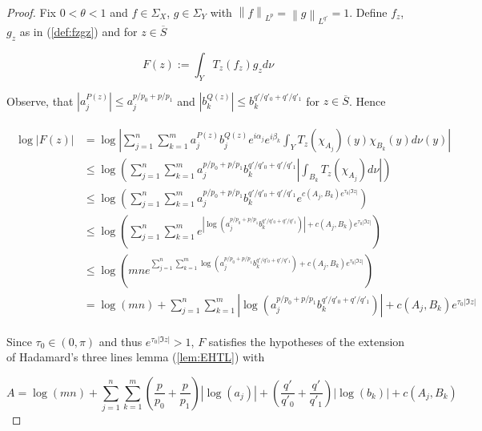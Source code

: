 \begin{proof}
	Fix $0 < \theta < 1$ and $f \in \Sigma_X$, $g \in \Sigma_Y$ with $\left\|f\right\|_{L^p} = \left\|g\right\|_{L^{q'}} = 1$. Define $f_z$, $g_z$ as in (\ref{def:fzgz}) and for $z \in \overline{S}$

	\begin{equation}
		F(z) := \int_Y T_z(f_z)g_z d\nu	
	\end{equation}

	Observe, that $\left| a^{P(z)}_j\right| \leqslant a_j^{p/p_0 + p/p_1}$ and $\left| b^{Q(z)}_k\right| \leqslant b_k^{q'/q'_0 + q'/q'_1}$ for $z \in \overline{S}$. Hence

	\begin{gather*}
		\begin{aligned}
			\log \left| F(z) \right| &= \log \left| \sum_{j = 1}^n\sum_{k = 1}^m a^{P(z)}_j b_j^{Q(z)} e^{i\alpha_j} e^{i\beta_k} \int_YT_z(\chi_{A_j})(y)\chi_{B_k}(y)d\nu(y)\right|\\
			&\leqslant  \log \left( \sum_{j = 1}^n\sum_{k = 1}^m a_j^{p/p_0 + p/p_1} b_k^{q'/q'_0 + q'/q'_1} \left|\int_{B_k} T_z(\chi_{A_j}) d\nu\right|\right)\\
			&\leqslant \log\left( \sum_{j = 1}^n\sum_{k = 1}^m a_j^{p/p_0 + p/p_1} b_k^{q'/q'_0 + q'/q'_1} e^{c(A_j,B_k)e^{\tau_0 \left| \Im z\right|}} \right)\\
			&\leqslant  \log\left( \sum_{j = 1}^n\sum_{k = 1}^m e^{\left|\log\left(a_j^{p/p_0 + p/p_1} b_k^{q'/q'_0 + q'/q'_1}\right)\right| + c(A_j,B_k)e^{\tau_0 \left| \Im z\right|}} \right)\\
			&\leqslant \log\left( mn e^{\sum_{j = 1}^n\sum_{k = 1}^m\log\left(a_j^{p/p_0 + p/p_1} b_k^{q'/q'_0 + q'/q'_1}\right) + c(A_j,B_k)e^{\tau_0 \left| \Im z\right|}} \right)\\
			&= \log\left( mn \right) + \sum_{j = 1}^n\sum_{k = 1}^m\left|\log\left(a_j^{p/p_0 + p/p_1} b_k^{q'/q'_0 + q'/q'_1}\right)\right| + c(A_j,B_k)e^{\tau_0 \left| \Im z\right|}
		\end{aligned}
	\end{gather*}

	Since $\tau_0 \in (0,\pi)$ and thus $e^{\tau_0 \left| \Im z\right|} > 1$, $F$ satisfies the hypotheses of the extension of Hadamard's three lines lemma (\ref{lem:EHTL}) with 

		\begin{equation*}
		A =  \log\left( mn \right) + \sum_{j = 1}^n\sum_{k = 1}^m\left( \frac{p}{p_0} + \frac{p}{p_1}\right)\left|\log\left(a_j\right)\right| + \left( \frac{q'}{q'_0} + \frac{q'}{q'_1} \right) \left|\log\left( b_k\right)\right| + c(A_j,B_k)
	\end{equation*}


\end{proof}
